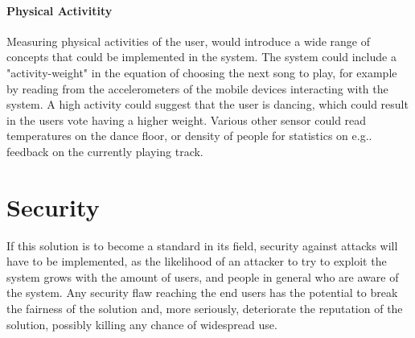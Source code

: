 \paragraph{Physical Activitity}
Measuring physical activities of the user, would introduce a wide range of concepts that could be implemented in the system. The system could include a "activity-weight" in the equation of choosing the next song to play, for example by reading from the accelerometers of the mobile devices interacting with the system. A high activity could suggest that the user is dancing, which could result in the users vote having a higher weight. Various other sensor could read temperatures on the dance floor, or density of people for statistics on e.g.. feedback on the currently playing track.

\section{Security}
If this solution is to become a standard in its field, security against attacks will have to be implemented, as the likelihood of an attacker to try to exploit the system grows with the amount of users, and people in general who are aware of the system. Any security flaw reaching the end users has the potential to break the fairness of the solution and, more seriously, deteriorate the reputation of the solution, possibly killing any chance of widespread use.